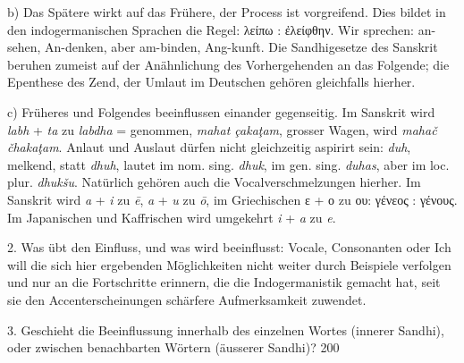{b) Das Spätere wirkt auf das Frühere, der Process ist vorgreifend. Dies bildet in den indogermanischen Sprachen die Regel: λείπω : ἐλείφθην. Wir sprechen: an-sehen, An-denken, aber am-binden, Ang-kunft. Die Sandhigesetze des Sanskrit beruhen zumeist auf der Anähnlichung des Vorhergehenden an das Folgende; die Epenthese des Zend, der Umlaut im Deutschen gehören gleichfalls hierher.

c) Früheres und Folgendes beeinflussen einander gegenseitig. Im Sanskrit wird \textit{labh} + \textit{ta} zu \textit{labdha} = genommen, \textit{mahat çakaţam}, grosser Wagen, wird \textit{mahač čhakaţam}. Anlaut und Auslaut dürfen nicht gleichzeitig aspirirt sein: \textit{duh}, melkend, statt \textit{dhuh}, lautet im nom. sing. \textit{dhuk}, im gen. sing. \textit{duhas}, aber im loc. plur. \textit{dhukšu}. Natürlich gehören auch die Vocalverschmelzungen hierher. Im Sanskrit wird \textit{a} + \textit{i} zu \textit{ē}, \textit{a} + \textit{u} zu \textit{ō}, im Griechischen ε + ο zu ου: γένεος : γένους. Im Japanischen und Kaffrischen wird umgekehrt \textit{i} + \textit{a} zu \textit{e}.

2. Was übt den Einfluss, und was wird beeinflusst: Vocale, Consonanten oder   Ich will die sich hier ergebenden Möglichkeiten nicht weiter durch Beispiele verfolgen und nur an die Fortschritte \label{fp.206} erinnern, die die Indogermanistik gemacht hat, seit sie den Accenterscheinungen schärfere Aufmerksamkeit zuwendet. 

3. Geschieht die Beeinflussung innerhalb des einzelnen Wortes (innerer Sandhi), oder zwischen benachbarten Wörtern (äusserer Sandhi)? 200{\textbar}{\textbar}\label{sp.200}

}
